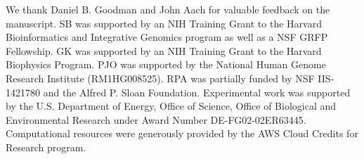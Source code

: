 We thank Daniel B. Goodman and John Aach for valuable feedback on the manuscript. SB was supported by an NIH Training Grant to the Harvard Bioinformatics and Integrative Genomics program as well as a NSF GRFP Fellowship. GK was supported by an NIH Training Grant to the Harvard Biophysics Program. PJO was supported by the National Human Genome Research Institute (RM1HG008525). RPA was partially funded by NSF IIS-1421780 and the Alfred P. Sloan Foundation. Experimental work was supported by the U.S. Department of Energy, Office of Science, Office of Biological and Environmental Research under Award Number DE-FG02-02ER63445. Computational resources were generously provided by the AWS Cloud Credits for Research program.


